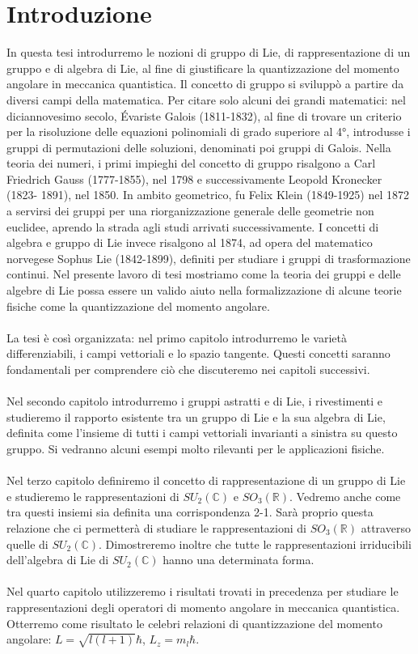 \documentclass[12pt,a4paper]{report}
\theoremstyle{definition}
\theoremstyle{Theorem}
\theoremstyle{definition}
\theoremstyle{definition}
\theoremstyle{definition}
\begin{document}
	\chapter*{Introduzione}
	In questa tesi introdurremo le nozioni di gruppo di Lie, di rappresentazione di un gruppo e di algebra di Lie, al fine di giustificare la quantizzazione del momento angolare in meccanica quantistica. Il concetto di gruppo si sviluppò a partire da diversi campi della matematica. Per citare solo alcuni dei grandi matematici: nel diciannovesimo secolo, Évariste Galois (1811-1832), al fine di trovare un criterio per la risoluzione delle equazioni polinomiali di grado superiore al 4°, introdusse i gruppi di permutazioni delle soluzioni, denominati poi gruppi di Galois. Nella teoria dei numeri, i primi impieghi del concetto di gruppo risalgono a Carl Friedrich Gauss (1777-1855), nel 1798 e successivamente Leopold Kronecker (1823-
	1891), nel 1850. In ambito geometrico, fu Felix Klein (1849-1925) nel 1872 a servirsi dei gruppi per una riorganizzazione generale delle geometrie non euclidee, aprendo la strada agli studi arrivati successivamente. I concetti di algebra e gruppo di Lie invece risalgono al 1874, ad opera del matematico norvegese Sophus Lie (1842-1899), definiti per studiare i gruppi di trasformazione continui.
	Nel presente lavoro di tesi mostriamo come la teoria dei gruppi e delle algebre di Lie possa essere un valido aiuto nella formalizzazione di alcune teorie fisiche come la quantizzazione del momento angolare.
	\\
	\\
	La tesi è così organizzata:
	nel primo capitolo introdurremo le varietà differenziabili, i campi vettoriali e lo spazio tangente. Questi concetti saranno fondamentali per comprendere ciò che discuteremo nei capitoli successivi.\\
	\\
	Nel secondo capitolo introdurremo i gruppi astratti e di Lie, i rivestimenti e studieremo il rapporto esistente tra un gruppo di Lie e la sua algebra di Lie, definita come l'insieme di tutti i campi vettoriali invarianti a sinistra su questo gruppo. Si vedranno alcuni esempi molto rilevanti per le applicazioni fisiche.\\
	\\
	Nel terzo capitolo definiremo il concetto di rappresentazione di un gruppo di Lie e studieremo le rappresentazioni di $SU_2(\mathbb{C})$ e $SO_3(\mathbb{R})$. Vedremo anche come tra questi insiemi sia definita una corrispondenza 2-1. Sarà proprio questa relazione che ci permetterà di studiare le rappresentazioni di $SO_3(\mathbb{R})$ attraverso quelle di $SU_2(\mathbb{C})$. Dimostreremo inoltre che tutte le rappresentazioni irriducibili dell'algebra di Lie di $SU_2(\mathbb{C})$ hanno una determinata forma.\\
	\\
	Nel quarto capitolo utilizzeremo i risultati trovati in precedenza per studiare le rappresentazioni degli operatori di momento angolare in meccanica quantistica. Otterremo come risultato le celebri relazioni di quantizzazione del momento angolare: $L=\sqrt{l(l+1)}\hbar$, $L_z=m_l\hbar$.
		\newpage
	\thispagestyle{empty}
	\mbox{}
	\newpage
\end{document}
